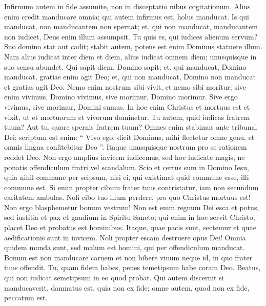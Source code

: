 \begin{biblechapter}
\begin{biblechapter}
\begin{biblechapter}
\begin{biblechapter}
\begin{biblechapter}
\begin{biblechapter}
\begin{biblechapter}
\begin{biblechapter}
\begin{biblechapter}
\begin{biblechapter}
\begin{biblechapter}
\begin{biblechapter}
\begin{biblechapter}
\begin{biblechapter}
\verse Infirmum autem in fide assumite, non in disceptatio nibus cogitationum. 
\verse Alius enim credit manducare omnia; qui autem infirmus est, holus manducat. 
 \verse Is qui manducat, non manducantem non spernat; et, qui non manducat, manducantem non iudicet, Deus enim illum assumpsit. 
\verse Tu quis es, qui iudices alienum servum? Suo domino stat aut cadit; stabit autem, potens est enim Dominus statuere illum.
 \verse Nam alius iudicat inter diem et diem, alius iudicat omnem diem; unusquisque in suo sensu abundet. 
\verse Qui sapit diem, Domino sapit; et, qui manducat, Domino manducat, gratias enim agit Deo; et, qui non manducat, Domino non manducat et gratias agit Deo. 
\verse Nemo enim nostrum sibi vivit, et nemo sibi moritur; \verse sive enim vivimus, Domino vivimus, sive morimur, Domino morimur. Sive ergo vivimus, sive morimur, Domini sumus. 
\verse In hoc enim Christus et mortuus est et vixit, ut et mortuorum et vivorum dominetur.
 \verse Tu autem, quid iudicas fratrem tuum? Aut tu, quare spernis fratrem tuum? Omnes enim stabimus ante tribunal Dei; 
\verse scriptum est enim:
 “ Vivo ego, dicit Dominus,
 mihi flectetur omne genu,
 et omnis lingua confitebitur Deo ”.
 \verse Itaque unusquisque nostrum pro se rationem reddet Deo. 
\verse Non ergo amplius invicem iudicemus, sed hoc iudicate magis, ne ponatis offendiculum fratri vel scandalum.
 \verse Scio et certus sum in Domino Iesu, quia nihil commune per seipsum, nisi ei, qui existimat quid commune esse, illi commune est. 
\verse Si enim propter cibum frater tuus contristatur, iam non secundum caritatem ambulas. Noli cibo tuo illum perdere, pro quo Christus mortuus est! 
\verse Non ergo blasphemetur bonum vestrum! 
\verse Non est enim regnum Dei esca et potus, sed iustitia et pax et gaudium in Spiritu Sancto; 
\verse qui enim in hoc servit Christo, placet Deo et probatus est hominibus. 
\verse Itaque, quae pacis sunt, sectemur et quae aedificationis sunt in invicem. 
\verse Noli propter escam destruere opus Dei! Omnia quidem munda sunt, sed malum est homini, qui per offendiculum manducat. 
 \verse Bonum est non manducare carnem et non bibere vinum neque id, in quo frater tuus offendit.
 \verse Tu, quam fidem habes, penes temetipsum habe coram Deo. Beatus, qui non iudicat semetipsum in eo quod probat. 
\verse Qui autem discernit si manducaverit, damnatus est, quia non ex fide; omne autem, quod non ex fide, peccatum est.
 

\end{biblechapter}
\end{biblechapter}
\end{biblechapter}
\end{biblechapter}
\end{biblechapter}
\end{biblechapter}
\end{biblechapter}
\end{biblechapter}
\end{biblechapter}
\end{biblechapter}
\end{biblechapter}
\end{biblechapter}
\end{biblechapter}
\end{biblechapter}
